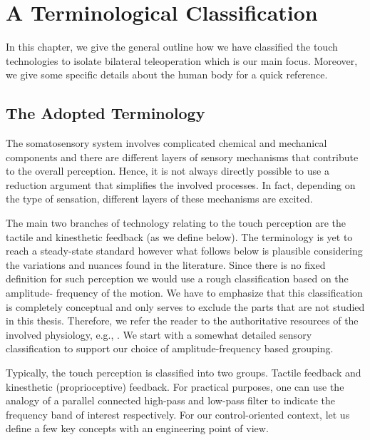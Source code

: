 \chapter{A Terminological Classification}
\label{chap:apdxphysio}

In this chapter, we give the general outline how we have classified the touch technologies to isolate bilateral teleoperation which is 
our main focus. Moreover, we give some specific details about the human body for a quick reference.


\section{The Adopted Terminology}

The somatosensory system involves complicated chemical and mechanical components and there are different layers of sensory mechanisms 
that contribute to the overall perception. Hence, it is not always directly possible to use a reduction argument that simplifies the 
involved processes. In fact, depending on the type of sensation, different layers of these mechanisms are excited.

The main two branches of technology relating to the touch perception are the tactile and kinesthetic feedback (as we define below). The 
terminology is yet to reach a steady-state standard however what follows below is plausible considering the variations and nuances found 
in the literature. Since there is no fixed definition for such perception we would use a rough  classification based on the amplitude-
frequency of the motion. We have to emphasize that this classification is completely conceptual and only serves to exclude the parts that 
are not studied in this thesis. Therefore, we refer the reader to the authoritative resources of the involved physiology, e.g., \cite{
kandel}. We start with a somewhat detailed sensory classification to support our choice of amplitude-frequency based grouping.

Typically, the touch perception is classified into two groups. Tactile feedback and kinesthetic (proprioceptive) feedback. For practical 
purposes, one can use the analogy of a parallel connected high-pass and low-pass filter to indicate the frequency band of interest 
respectively. For our control-oriented context, let us define a few key concepts with an engineering point of view. 

